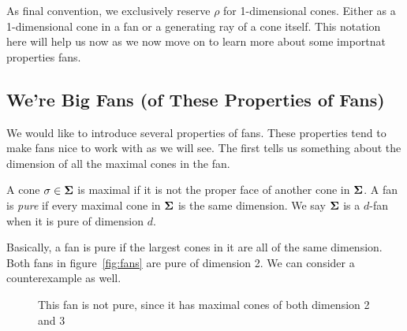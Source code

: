 \documentclass[12pt,oneside]{../../sfsuthesis}
\begin{document}
As final convention, we exclusively reserve \( \rho \) for 1-dimensional cones.
Either as a 1-dimensional cone in a fan or a generating ray of a cone itself.
This notation here will help us now as we now move on to learn more about some importnat properties fans.

\subsection{We're Big Fans (of These Properties of Fans)}

We would like to introduce several properties of fans.
These properties tend to make fans nice to work with as we will see.
The first tells us something about the dimension of all the maximal cones in the fan.
\begin{definition}[Pure]\th\label{def:pure}
    A cone \(\sigma \in {\bm{\Sigma}} \) is maximal if it is not the proper face of another cone in \( {\bm{\Sigma}} \).
    A fan is \emph{pure} if every maximal cone in \( {\bm{\Sigma}} \) is the same dimension.
    We say \( {\bm{\Sigma}} \) is a \( d \)-fan when it is pure of dimension \( d \).
\end{definition}
Basically, a fan is pure if the largest cones in it are all of the same dimension.
Both fans in figure~\ref{fig:fans} are pure of dimension 2.
We can consider a counterexample as well.
\begin{figure}[H]
    \centering
    \caption{This fan is not pure, since it has maximal cones of both dimension 2 and 3}
\end{figure}
\end{document}

